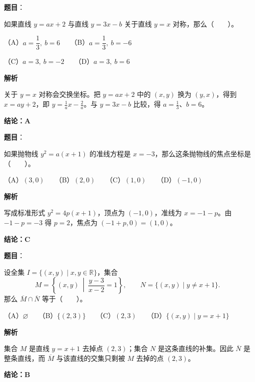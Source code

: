 \begin{answer}

\textbf{题目}：

如果直线 $y=ax+2$ 与直线 $y=3x-b$ 关于直线 $y=x$ 对称，那么\mbox{（　　）}。

（A）$a=\dfrac13,\ b=6$　　（B）$a=\dfrac13,\ b=-6$

（C）$a=3,\ b=-2$　　（D）$a=3,\ b=6$

\textbf{解析}

关于 $y=x$ 对称会交换坐标。把 $y=ax+2$ 中的 $(x,y)$ 换为 $(y,x)$，得到 $x=ay+2$，即 $y=\frac1a x-\frac2a$。与 $y=3x-b$ 比较，得 $a=\frac13$、$b=6$。

\textbf{结论：A}


\end{answer}
\begin{answer}

\textbf{题目}：

如果抛物线 $y^2=a(x+1)$ 的准线方程是 $x=-3$，那么这条抛物线的焦点坐标是\mbox{（　　）}。

（A）$(3,0)$　　（B）$(2,0)$　　（C）$(1,0)$　　（D）$(-1,0)$

\textbf{解析}

写成标准形式 $y^2=4p(x+1)$，顶点为 $(-1,0)$，准线为 $x=-1-p$。由 $-1-p=-3$ 得 $p=2$，焦点为 $(-1+p,0)=(1,0)$。

\textbf{结论：C}


\end{answer}
\begin{answer}

\textbf{题目}：

设全集 $I=\{(x,y)\mid x,y\in\mathbb R\}$，集合
\nopagebreak[4]
\[
M=\left\{(x,y)\ \middle|\ \frac{y-3}{x-2}=1\right\},\qquad
N=\{(x,y)\mid y\ne x+1\}.
\]
那么 $\overline M\cap\overline N$ 等于\mbox{（　　）}。

（A）$\varnothing$　　（B）$\{(2,3)\}$　　（C）$(2,3)$　　（D）$\{(x,y)\mid y=x+1\}$

\textbf{解析}

集合 $M$ 是直线 $y=x+1$ 去掉点 $(2,3)$；集合 $N$ 是这条直线的补集。因此 $\overline N$ 是整条直线，而 $\overline M$ 与该直线的交集只剩被 $M$ 去掉的点 $(2,3)$。

\textbf{结论：B}


\end{answer}
